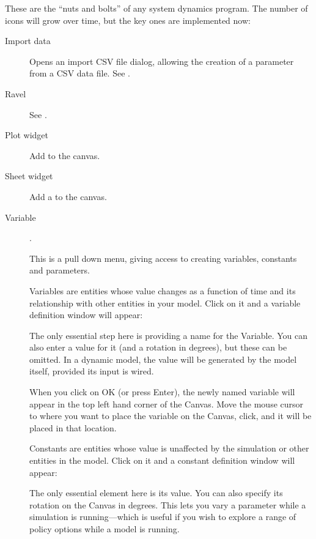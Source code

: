 These are the ``nuts and bolts'' of any system dynamics program.
The number of icons will grow over time, but the key ones are implemented
now:
\begin{description}
\item [{Import data}]  Opens an import CSV
file dialog, allowing the creation of a parameter from a CSV data
file. See .
\item [{Ravel}] See .
\item [{Plot widget}]  Add 
to the canvas.
\item [{Sheet widget}]  Add a 
to the canvas.
\item [{Variable}] . \label{Variable}

This is a pull down menu, giving access to creating variables, constants
and parameters.

Variables are entities whose value changes as a function of time and
its relationship with other entities in your model. Click on it and
a variable definition window will appear:
\begin{center}
\par\end{center}

The only essential step here is providing a name for the Variable.
You can also enter a value for it (and a rotation in degrees), but
these can be omitted. In a dynamic model, the value will be generated
by the model itself, provided its input is wired.

When you click on OK (or press Enter), the newly named variable will
appear in the top left hand corner of the Canvas. Move the mouse cursor
to where you want to place the variable on the Canvas, click, and
it will be placed in that location.

Constants are entities whose value is unaffected by the simulation
or other entities in the model. Click on it and a constant definition
window will appear:
\begin{center}
\par\end{center}

The only essential element here is its value. You can also specify
its rotation on the Canvas in degrees. This lets you vary a parameter
while a simulation is running---which is useful if you wish to explore
a range of policy options while a model is running.


\end{description}
